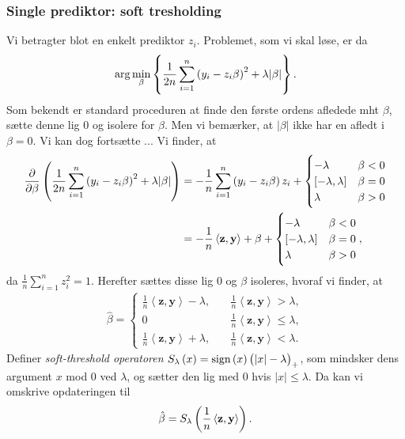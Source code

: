 \subsubsection{Single prediktor: soft tresholding}
Vi betragter blot en enkelt prediktor \(z_i\). 
Problemet, som vi skal løse, er da
\begin{align*}
\arg \min_{\beta} \cbr{\frac{1}{2n} \sum_{i=1}^n \del{y_i - z_{i} \beta}^2 + \lambda \vert \beta \vert}.
\end{align*}
Som bekendt er standard proceduren at finde den første ordens afledede mht $\beta$, sætte denne lig 0 og isolere for $\beta$. 
Men vi bemærker, at \(\vert \beta \vert \) ikke har en afledt i $\beta=0$.
Vi kan dog fortsætte ...
Vi finder, at
\begin{align*}
\frac{\partial}{\partial \beta} \del{\frac{1}{2n} \sum_{i=1}^n \del{y_i - z_{i} \beta}^2 + \lambda \vert \beta \vert}
&= -\frac{1}{n} \sum_{i=1}^n \del{y_i - z_{i} \beta} z_i + \begin{cases}
-\lambda \quad &\beta < 0 \\
[-\lambda, \lambda] & \beta = 0 \\
\lambda & \beta >0 
\end{cases}  \\
&= -\frac{1}{n} \left\langle \mathbf{z}, \mathbf{y} \right\rangle + \beta + \begin{cases}
-\lambda \quad &\beta < 0 \\
[-\lambda, \lambda] & \beta = 0 \\
\lambda & \beta >0 
\end{cases},
\end{align*}
da $\frac{1}{n} \sum_{i=1}^n z_i^2=1$. Herefter sættes disse lig 0 og $\beta$ isoleres, hvoraf vi finder, at
\begin{align*}
\hat{\beta} = \begin{cases}
\frac{1}{n} \left\langle \mathbf{z}, \mathbf{y} \right\rangle - \lambda, \quad &\frac{1}{n} \left\langle \mathbf{z}, \mathbf{y} \right\rangle > \lambda, \\
0 &\frac{1}{n} \left\langle \mathbf{z}, \mathbf{y} \right\rangle \leq \lambda, \\
\frac{1}{n} \left\langle \mathbf{z}, \mathbf{y} \right\rangle + \lambda, &\frac{1}{n} \left\langle \mathbf{z}, \mathbf{y} \right\rangle < \lambda.
\end{cases}
\end{align*}
Definer \textit{soft-threshold operatoren} $S_\lambda\del{x}=\text{sign}\del{x} \del{\vert x \vert - \lambda}_+$, som mindsker dens argument $x$ mod 0 ved $\lambda$, og sætter den lig med 0 hvis $\vert x \vert \leq \lambda$. Da kan vi omskrive opdateringen til
\begin{align*}
\hat{\beta} = S_\lambda \del{\frac{1}{n} \left\langle \mathbf{z}, \mathbf{y} \right\rangle}.
\end{align*}
%
